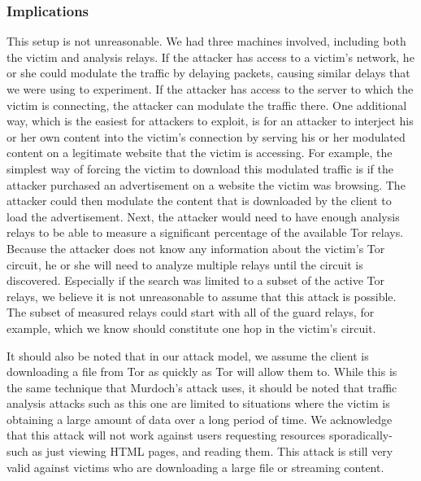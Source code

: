 \documentclass[12pt,journal]{IEEEtran}
\begin{document}
\subsubsection{Implications}
This setup is not unreasonable. We had three machines involved, including both the victim and analysis relays. If the attacker has access to a victim's network, he or she could modulate the traffic by delaying packets, causing similar delays that we were using to experiment. If the attacker has access to the server to which the victim is connecting, the attacker can modulate the traffic there.
One additional way, which is the easiest for attackers to exploit, is for an attacker to interject his or her own content into the victim's connection by serving his or her modulated content on a legitimate website that the victim is accessing. For example, the simplest way of forcing the victim to download this modulated traffic is if the attacker purchased an advertisement on a website the victim was browsing. The attacker could then modulate the content that is downloaded by the client to load the advertisement.
Next, the attacker would need to have enough analysis relays to be able to measure a significant percentage of the available Tor relays. Because the attacker does not know any information about the victim's Tor circuit, he or she will need to analyze multiple relays until the circuit is discovered. Especially if the search was limited to a subset of the active Tor relays, we believe it is not unreasonable to assume that this attack is possible. The subset of measured relays could start with all of the guard relays, for example, which we know should constitute one hop in the victim's circuit.
\par
It should also be noted that in our attack model, we assume the client is downloading a file from Tor as quickly as Tor will allow them to. While this is the same technique that Murdoch's attack uses, it should be noted that traffic analysis attacks such as this one are limited to situations where the victim is obtaining a large amount of data over a long period of time. We acknowledge that this attack will not work against users requesting resources sporadically- such as just viewing HTML pages, and reading them. This attack is still very valid against victims who are downloading a large file or streaming content.
\end{document}
